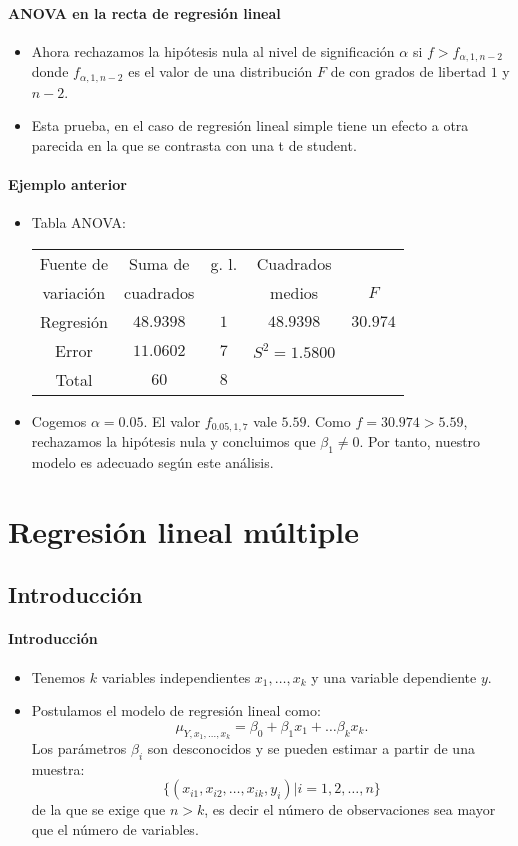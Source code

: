 \begin{frame}
\frametitle{ANOVA en la recta de regresión lineal}
\begin{itemize}
\item<2->{Ahora rechazamos la hipótesis nula al nivel de significación $\alpha$ si $f>f_{\alpha,1,n-2}$
donde $f_{\alpha,1,n-2}$ es el valor de una distribución $F$ de
con grados de libertad $1$ y $n-2$.}
\item<3->{Esta prueba, en el caso de regresión lineal simple tiene un efecto
a otra parecida en la que se contrasta con una t de student.}
\end{itemize}

\end{frame}

\begin{frame}
\frametitle{Ejemplo anterior}
\begin{itemize}
\item<2->{Tabla ANOVA:\vskip1cm
\begin{tabular}{|c|c|c|c|c|}\hline
Fuente de & Suma de & g. l. & Cuadrados & \\
variación & cuadrados &  & medios &  $F$\\\hline
Regresión & $48.9398$ & $1$ & $48.9398$ & $30.974$ \\
Error & $11.0602$ & $7$& $S^2=1.5800$ & \\
\hline Total & $60$ & $8$ & & \\\hline\end{tabular}}
\item<3->{Cogemos $\alpha =0.05$. El valor $f_{0.05,1,7}$ vale $5.59$. Como $f=30.974 > 5.59$, rechazamos la hipótesis nula y concluimos que $\beta_1\not=0$. Por tanto, nuestro modelo es adecuado según este análisis.}
\end{itemize}

\end{frame}

\chapter{Regresión lineal múltiple}
\section{Introducción}
\begin{frame}
\frametitle{Introducción}
\begin{itemize}
\item<2->{Tenemos $k$ variables independientes $x_1,\ldots, x_k$ y una
variable dependiente $y$.}

\item<3->{Postulamos el modelo de regresión lineal como:
$$\mu_{Y,x_1,\ldots,x_k}= \beta_0+\beta_1 x_1+\ldots\beta_k x_k.$$
Los parámetros $\beta_i$ son desconocidos y se pueden estimar a
partir de una muestra:
$$\{(x_{i1},x_{i2},\ldots,x_{ik},y_i)| i=1,2,\ldots,n\}$$
de la que se exige que $n>k$, es decir el número de observaciones
sea mayor que el número de variables.}
\end{itemize}
\end{frame}

